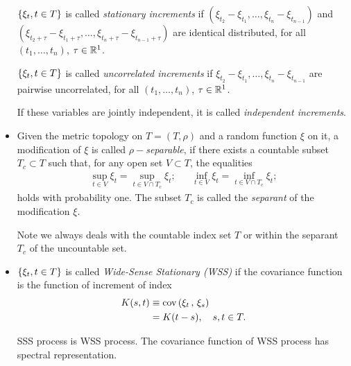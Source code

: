 \documentclass[11pt]{article}
\begin{document}
\begin{itemize}
$\left\{\xi_{t}, t\in T\right\}$ is called  \emph{stationary increments} if $(\xi_{t_{2}}-\xi_{t_{1}},\ldots, \xi_{t_{n}}-\xi_{t_{n-1}}  )$ and $(\xi_{t_{2}+\tau}-\xi_{t_{1}+\tau},\ldots, \xi_{t_{n}+\tau} - \xi_{t_{n-1}+\tau}  )$ are identical distributed, for all $(t_{1},\ldots, t_{n})$, $\tau\in {\mathbb R}^{1}$.

$\left\{\xi_{t}, t\in T\right\}$ is called  \emph{uncorrelated increments} if $\xi_{t_{2}}-\xi_{t_{1}},\ldots, \xi_{t_{n}}-\xi_{t_{n-1}}  $ are pairwise uncorrelated, for all $(t_{1},\ldots, t_{n})$, $\tau\in {\mathbb R}^{1}$.

If these variables are jointly independent, it is called \emph{independent increments}. \\[3pt]

\item Given the metric topology on $T = (T,\rho)$ and a random function $\xi$ on it, a modification of $\xi$ is called \emph{$\rho-$separable}, if there exists a countable subset $T_{c} \subset T$ such that, for any open set $V\subset T$, the equalities 
\begin{align*}
\sup_{t\in V}\xi_{t} = \sup_{t\in V\cap T_{c}}\xi_{t}; && \inf_{t\in V}\xi_{t} = \inf_{t\in V\cap T_{c}}\xi_{t};
\end{align*} holds with probability one.  The subset $T_{c}$ is called the \emph{separant} of the modification $\xi$. 

Note we always deals with the countable index set $T$ or within the separant $T_{c}$ of the uncountable set. \\

\item $\left\{\xi_{t}, t\in T\right\}$ is called \emph{Wide-Sense Stationary (WSS)} if the covariance function is the function of increment of index
\begin{align*}
K(s,t) &\equiv  \text{cov}\left( \xi_{t}\,,\, \xi_{s} \right)\\
&= K(t-s),\quad  s,t\in T.
\end{align*} 

SSS process is WSS process. The covariance function of WSS process has spectral representation. \\[15pt] 
\end{itemize}
\end{document}
